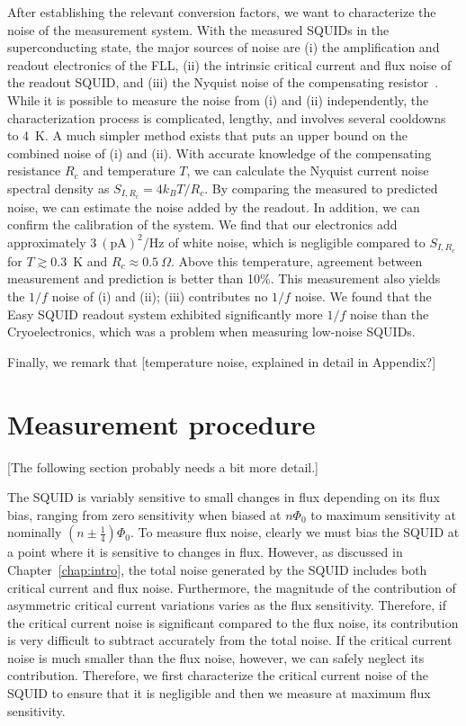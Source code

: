 After establishing the relevant conversion factors, we want to characterize the noise of the measurement system. With the measured SQUIDs in the superconducting state, the major sources of noise are (i) the amplification and readout electronics of the FLL, (ii) the intrinsic critical current and flux noise of the readout SQUID, and (iii) the Nyquist noise of the compensating resistor~\citep{Nyquist:PR:1928}. While it is possible to measure the noise from (i) and (ii) independently, the characterization process is complicated, lengthy, and involves several cooldowns to 4~K. A much simpler method exists that puts an upper bound on the combined noise of (i) and (ii). With accurate knowledge of the compensating resistance $R_c$ and temperature $T$, we can calculate the Nyquist current noise spectral density as $S_{I,R_c} = 4 k_B T/R_c$. By comparing the measured to predicted noise, we can estimate the noise added by the readout. In addition, we can confirm the calibration of the system. We find that our electronics add approximately $3~(\text{pA})^2$/Hz of white noise, which is negligible compared to $S_{I,R_c}$ for $T \gtrsim 0.3$~K and $R_c \approx 0.5~\Omega$. Above this temperature, agreement between measurement and prediction is better than 10\%. This measurement also yields the $1/f$ noise of (i) and (ii); (iii) contributes no $1/f$ noise. We found that the Easy SQUID readout system exhibited significantly more $1/f$ noise than the Cryoelectronics, which was a problem when measuring low-noise SQUIDs.

Finally, we remark that [temperature noise, explained in detail in Appendix?]

\section{Measurement procedure}\label{chap:exp:sec:meas_proc}

[The following section probably needs a bit more detail.]

The SQUID is variably sensitive to small changes in flux depending on its flux bias, ranging from zero sensitivity when biased at $n\Phi_0$ to maximum sensitivity at nominally $(n\pm\tfrac{1}{4})\Phi_0$. To measure flux noise, clearly we must bias the SQUID at a point where it is sensitive to changes in flux. However, as discussed in Chapter~\ref{chap:intro}, the total noise generated by the SQUID includes both critical current and flux noise. Furthermore, the magnitude of the contribution of asymmetric critical current variations varies as the flux sensitivity. Therefore, if the critical current noise is significant compared to the flux noise, its contribution is very difficult to subtract accurately from the total noise. If the critical current noise is much smaller than the flux noise, however, we can safely neglect its contribution. Therefore, we first characterize the critical current noise of the SQUID to ensure that it is negligible and then we measure at maximum flux sensitivity.

